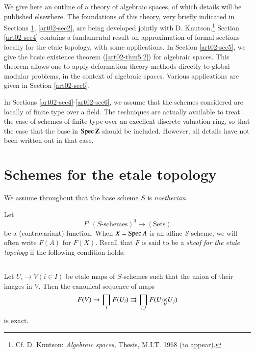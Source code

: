 We give here an outline of a theory of algebraic spaces, of which details will be published elsewhere. The foundations of this theory, very briefly indicated in Sections \ref{art02-sec1}, \ref{art02-sec2}, are being developed jointly with D. Knutson.\footnote{Cf. D. Knutson: {\em Algebraic spaces,} Thesis, M.I.T. 1968 (to appear).} Section \ref{art02-sec4} contains a fundamental result on approximation of formal sections locally for the etale topology, with some applications. In Section \ref{art02-sec5}, we give the basic existence theorem (\ref{art02-thm5.2}) for algebraic spaces. This theorem allows one to apply deformation theory methods directly to global modular problems, in the context of algebraic spaces. Various applications are given in Section \ref{art02-sec6}.

In Sections \ref{art02-sec4}-\ref{art02-sec6}, we assume that the schemes considered are locally of finite type over a field. The techniques are actually available to treat the case of schemes of finite type over an excellent discrete valuation ring, so that the case that the base in $\operatorname{\mathrm{Spec}} \mathbf{Z}$ should be included. However, all details have not been written out in that case.

\section{Schemes for the etale topology}\label{art02-sec1}

We assume throughout that the base scheme $S$ is {\em noetherian.}

Let
\begin{equation}
F:(S\text{-schemes})^{0}\to (\text{Sets})\label{art02-eq1.1}
\end{equation}
be a (contravariant) function. When $X=\operatorname{\mathrm{Spec}} A$ is an affine $S$-scheme, we will often write $F(A)$ for $F(X)$. Recall that $F$ is said to be a {\em sheaf for the etale topology} if the following condition holds:

\setcounter{subsection}{1}
\subsection{}\label{art02-sec1.2}

Let $U_{i}\to V(i\in I)$ be etale maps of $S$-schemes such that the union of their images in $V$. Then the canonical sequence of maps 
$$
F(V)\to \prod\limits_{i} F(U_{i})\rightrightarrows \prod\limits_{i,j}F(\fprod{U_{i}}{U_{j}}{V})
$$\pageoriginale
is exact.

